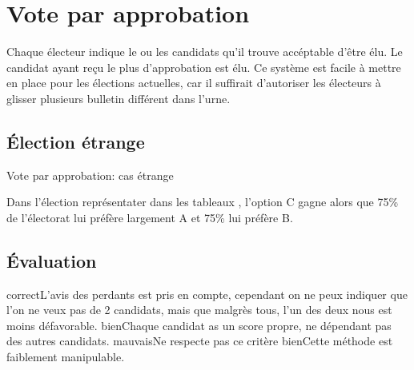 \documentclass[../report]{subfiles}
\begin{document}

  \section{Vote par approbation}

  Chaque électeur indique le ou les candidats qu'il trouve accéptable d'être élu.
  Le candidat ayant reçu le plus d'approbation est élu.
  Ce système est facile à mettre en place pour les élections actuelles, car il suffirait d'autoriser
  les électeurs à glisser plusieurs bulletin différent dans l'urne.

  \subsection{Élection étrange}

  \begin{table}[h]
    \begin{center}
      \caption{Vote par approbation: cas étrange}%
      \label{fig:diff:appro:caslim1}
    \end{center}
  \end{table}

  Dans l'élection représentater dans les tableaux , l'option
  C gagne alors que 75\% de l'électorat lui préfère largement A et 75\% lui préfère B.

  \subsection{Évaluation}
  \tabcritere%
    {correct}{L'avis des perdants est pris en compte, cependant on ne peux indiquer que l'on ne veux pas de 2 candidats, mais que malgrès tous, l'un des deux nous est moins défavorable.}%
    {bien}{Chaque candidat as un score propre, ne dépendant pas des autres candidats.}%
    {mauvais}{Ne respecte pas ce critère}%
    {bien}{Cette méthode est faiblement manipulable.}
\end{document}
